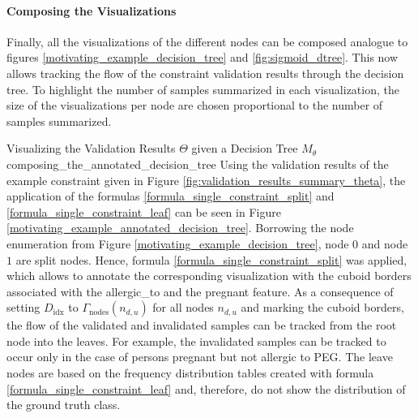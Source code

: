 \paragraph{Composing the Visualizations}
Finally, all the visualizations of the different nodes can be composed analogue to figures \ref{motivating_example_decision_tree} and \ref{fig:sigmoid_dtree}. This now allows tracking the flow of the constraint validation results through the decision tree. To highlight the number of samples summarized in each visualization, the size of the visualizations per node are chosen proportional to the number of samples summarized.

\begin{Bsp}{Visualizing the Validation Results $\Theta$ given a Decision Tree $M_\theta$}{composing_the_annotated_decision_tree}
    Using the validation results of the example constraint given in Figure \ref{fig:validation_results_summary_theta}, the application of the formulas \ref{formula_single_constraint_split} and \ref{formula_single_constraint_leaf} can be seen in Figure \ref{motivating_example_annotated_decision_tree}. Borrowing the node enumeration from Figure \ref{motivating_example_decision_tree}, node $0$ and node $1$ are split nodes. Hence, formula \ref{formula_single_constraint_split} was applied, which allows to annotate the corresponding visualization with the cuboid borders associated with the \glqq allergic\_to\grqq{} and the \glqq pregnant\grqq{} feature. As a consequence of setting $D_{\text{idx}}$ to $\Gamma_\text{nodes}(n_{d,u})$ for all nodes $n_{d,u}$ and marking the cuboid borders, the flow of the validated and invalidated samples can be tracked from the root node into the leaves. For example, the invalidated samples can be tracked to occur only in the case of persons pregnant but not allergic to PEG. The leave nodes are based on the frequency distribution tables created with formula \ref{formula_single_constraint_leaf} and, therefore, do not show the distribution of the ground truth class.
    

\end{Bsp}
